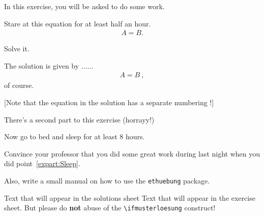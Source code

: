 \documentclass[11pt,a4paper]{article}
\begin{document}
\MakeUebungHeader


In this exercise, you will be asked to do some work.


\begin{exenumerate}
\item Stare at this equation for at least half an hour.
  \begin{align}
    A = B.
  \end{align}

\item Solve it.

  \begin{loesung}
    The solution is given by ...... 
    \begin{align}
      A=B\ ,
    \end{align}
    of course.

    [Note that the equation in the solution has a separate numbering !]
  \end{loesung}
\end{exenumerate}

There's a second part to this exercise (horrayy!)

\begin{exenumerate} %
\item \label{expart:Sleep} Now go to bed and sleep for at least 8 hours.
\item Convince your professor that you did some great work during last night when you did
  point~\ref{expart:Sleep}.
\end{exenumerate}

Also, write a small manual on how to use the \texttt{ethuebung} package.


\ifmusterloesung
Text that will appear in the solutions sheet
\else
Text that will appear in the exercise sheet.
But please do {\bf not} abuse of the \texttt{\textbackslash ifmusterloesung} construct!
\end{document}

